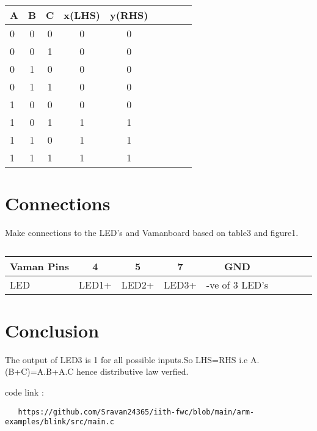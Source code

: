\documentclass[10pt, a4paper]{article}
\begin{document}
\begin{table}[htbp]
 \begin{center}
    \begin{tabular}{|l|c|c|c|c|c|c|c|c} \hline \textbf{A}
  & \textbf{B} & \textbf{C} & \textbf{x(LHS)}& \textbf{y(RHS)} \\
 \hline
0&0&0&0&0 \\ \hline
0&0&1&0&0 \\ \hline
0&1&0&0&0\\ \hline
0&1&1&0&0  \\ \hline
1&0&0&0&0 \\ \hline
1&0&1&1&1\\ \hline
1&1&0&1&1\\ \hline
1&1&1&1&1\\ \hline
\end{tabular}   
\end{center}
\caption{\label{table:dummytable} }
\end{table}







\section{Connections}

Make connections to the LED's and Vamanboard based on table3 and figure1.
\begin{table}[htbp]
 \begin{center}
    \begin{tabular}{|l|c|c|c|c|c|c|c|c} \hline \textbf{Vaman Pins}
  & \textbf{4} & \textbf{5} & \textbf{7}& \textbf{GND}\\
 \hline
LED&LED1+&LED2+&LED3+&-ve of 3 LED's\\ \hline

\end{tabular}   
\end{center}
\caption{\label{table:dummytable} }
\end{table}




\section{Conclusion}
The output of LED3  is 1 for all possible inputs.So LHS=RHS i.e  A.(B+C)=A.B+A.C hence distributive law verfied.

code link :
 \begin{lstlisting}
   https://github.com/Sravan24365/iith-fwc/blob/main/arm-examples/blink/src/main.c
\end{lstlisting}
\end{document}
